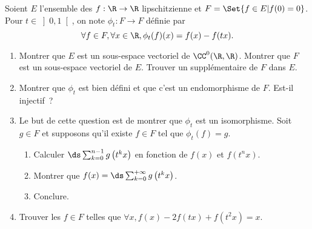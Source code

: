 \begin{enonce}
\begin{exercise}[ID={RMS124 E330 X-ENS PSI},subtitle={},tags={}]
Soient $E$ l'ensemble des $f:\R\to\R$ lipschitzienne et $F=\Set{f\in E| f(0) = 0}$.
Pour $t\in\left]0,1\right[$, on note $\phi_t : F\to F$ définie par
\begin{equation*}
  \forall f\in F, \forall x\in\R, \phi_t(f)(x) = f(x) - f(tx).
\end{equation*}
\begin{enumerate}
  \item Montrer que $E$ est un sous-espace vectoriel de $\CC^0(\R,\R)$.
    Montrer que $F$ est un sous-espace vectoriel de $E$.
    Trouver un supplémentaire de $F$ dans $E$.
  \item Montrer que $\phi_t$ est bien défini et que c'est un endomorphisme de $F$.
    Est-il injectif~?
  \item Le but de cette question est de montrer que $\phi_t$ est un isomorphisme.
    Soit $g\in F$ et supposons qu'il existe $f\in F$ tel que $\phi_t(f)=g$.
    \begin{enumerate}
      \item Calculer $\ds\sum_{k=0}^{n-1} g\left( t^kx \right)$ en fonction de $f(x)$ et $f(t^n x)$.
      \item Montrer que $f(x)=\ds\sum_{k=0}^{+\infty} g\left( t^k x \right)$.
      \item Conclure.
    \end{enumerate}
  \item Trouver les $f\in F$ telles que 
    \begin{math} \forall x, f(x) - 2f(tx) + f(t^2x) = x \end{math}.
\end{enumerate}
\end{exercise}
\begin{solution}
\end{solution}
\end{enonce}
